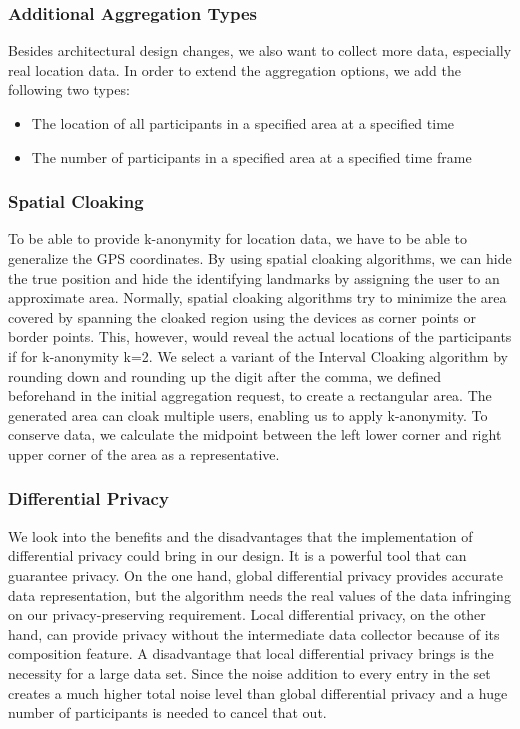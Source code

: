\subsubsection{Additional Aggregation Types}
Besides architectural design changes, we also want to collect more data, especially real location data. In order to extend the aggregation options, we add the following two types:
\begin{itemize}
    \item The location of all participants in a specified area at a specified time
    \item The number of participants in a specified area at a specified time frame
\end{itemize}

\subsubsection{Spatial Cloaking}
To be able to provide k-anonymity for location data, we have to be able to generalize the GPS coordinates. By using spatial cloaking algorithms, we can hide the true position and hide the identifying landmarks by assigning the user to an approximate area. Normally, spatial cloaking algorithms try to minimize the area covered by spanning the cloaked region using the devices as corner points or border points. This, however, would reveal the actual locations of the participants if for k-anonymity k=2. We select a variant of the Interval Cloaking algorithm by rounding down and rounding up the digit after the comma, we defined beforehand in the initial aggregation request, to create a rectangular area. The generated area can cloak multiple users, enabling us to apply k-anonymity. To conserve data, we calculate the midpoint between the left lower corner and right upper corner of the area as a representative.

\subsubsection{Differential Privacy}
We look into the benefits and the disadvantages that the implementation of differential privacy could bring in our design. It is a powerful tool that can guarantee privacy. On the one hand, global differential privacy provides accurate data representation, but the algorithm needs the real values of the data infringing on our privacy-preserving requirement. Local differential privacy, on the other hand, can provide privacy without the intermediate data collector because of its composition feature. A disadvantage that local differential privacy brings is the necessity for a large data set. Since the noise addition to every entry in the set creates a much higher total noise level than global differential privacy and a huge number of participants is needed to cancel that out.

